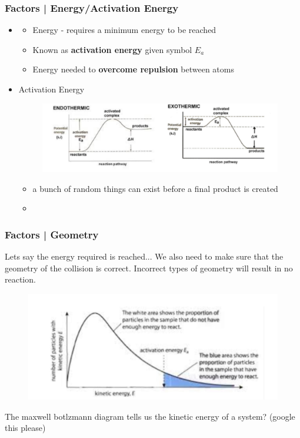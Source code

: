 \documentclass{article}
\begin{document}
\subsubsection{Factors | Energy/Activation Energy}
\begin{itemize}
\item	\begin{itemize}
		\item Energy - requires a minimum energy to be reached
		\item Known as \textbf{activation energy} given symbol \textbf{$E_{a}$}
		\item Energy needed to \textbf{overcome repulsion} between atoms
	\end{itemize}
\item Activation Energy
	\begin{figure}[H]
	\includegraphics[width=\textwidth]{2.1fig4.png}
	\end{figure}
	\begin{itemize}
		\item a bunch of random things can exist before a final product is created
		\item {}
	\end{itemize}
\end{itemize}

\subsubsection{Factors | Geometry}
Lets say the energy required is reached... We also need to make sure that the geometry of the collision is correct. Incorrect types of geometry will result in no reaction.

\begin{figure}[H]
	\centering
	\includegraphics[width=\textwidth]{2.1fig5.png}
\end{figure}

The maxwell botlzmann diagram tells us the kinetic energy of a system? (google this please)
\end{document}
